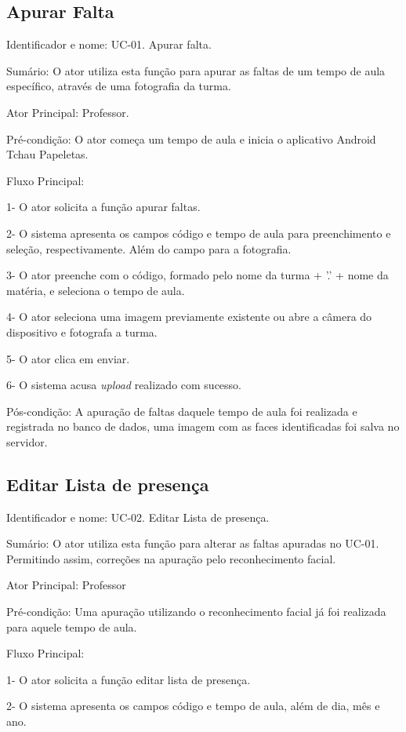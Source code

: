 \subsection{Apurar Falta} 
\noindent
Identificador e nome: UC-01. Apurar falta.

Sumário: O ator utiliza esta função para apurar as faltas de um tempo de aula específico, através de uma fotografia da turma.

Ator Principal: Professor.

Pré-condição: O ator começa um tempo de aula e inicia o aplicativo Android Tchau Papeletas.

Fluxo Principal:

1- O ator solicita a função apurar faltas.

2- O sistema apresenta os campos código e tempo de aula para preenchimento e seleção, respectivamente. Além do campo para a fotografia.

3- O ator preenche com o código, formado pelo nome da turma + '.' + nome da matéria, e seleciona o tempo de aula.

4- O ator seleciona uma imagem previamente existente  ou abre a câmera do dispositivo e fotografa a turma.

5- O ator clica em enviar.

6- O sistema acusa \textit{upload} realizado com sucesso.

Pós-condição: A apuração de faltas daquele tempo de aula foi realizada e registrada no banco de dados, uma imagem com as faces identificadas foi salva no servidor.


\subsection{Editar Lista de presença} 
\noindent
Identificador e nome: UC-02. Editar Lista de presença.


Sumário: O ator utiliza esta função para alterar as faltas apuradas no UC-01. Permitindo assim, correções na apuração pelo reconhecimento facial.

Ator Principal: Professor

Pré-condição: Uma apuração utilizando o reconhecimento facial já foi realizada para aquele tempo de aula.

Fluxo Principal:

1- O ator solicita a função editar lista de presença.

2- O sistema apresenta os campos código e tempo de aula, além de dia, mês e ano.


